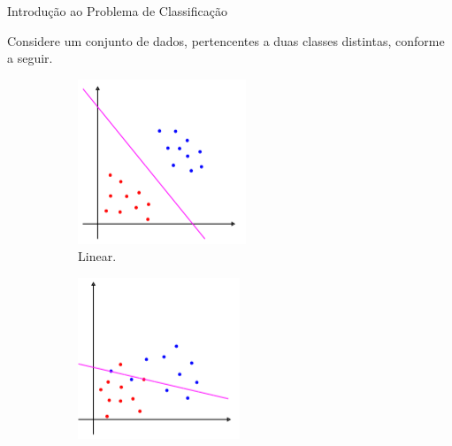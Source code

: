 \documentclass[12pt]{beamer}
\theoremstyle{definition}%
\begin{document}
\begin{frame}{Introdução ao Problema de Classificação}

Considere um conjunto de dados, pertencentes a duas classes distintas, conforme  a seguir.

\begin{figure}[!h] 
	\centering
	\begin{subfigure}[h]{0.3\textwidth}
		\centering
		\includegraphics[width=\textwidth]{SVM_linear}
		\caption{Linear. \label{fig1:a}}
	\end{subfigure}
	\begin{subfigure}[!h]{0.3\textwidth}
		\centering
		\includegraphics[width=\textwidth]{SVM_flexivel}

\end{subfigure}
\end{figure}
\end{frame}
\end{document}
